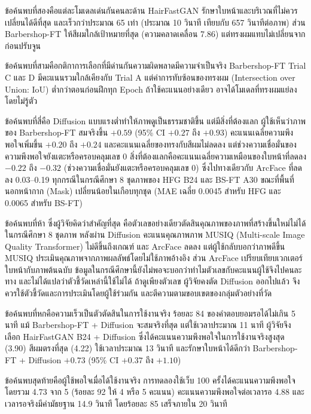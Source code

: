 ข้อค้นพบที่สองคือแต่ละโมเดลเด่นกันคนละด้าน
HairFastGAN รักษาใบหน้าและบริเวณที่ไม่ควรเปลี่ยนได้ดีที่สุด และเร็วกว่าประมาณ 65 เท่า
(ประมาณ 10 วินาที เทียบกับ 657 วินาทีต่อภาพ)
ส่วน Barbershop-FT ให้สีผมใกล้เป้าหมายที่สุด (ความคลาดเคลื่อน 7.86) แต่ทรงผมแทบไม่เปลี่ยนจากก่อนปรับจูน

ข้อค้นพบที่สามคือกติกาการเลือกที่มีด่านกันความผิดพลาดมีความจำเป็นจริง
Barbershop-FT Trial C และ D มีคะแนนรวมใกล้เคียงกับ Trial A
แต่ค่าการทับซ้อนของทรงผม (Intersection over Union: IoU) ต่ำกว่าตอนก่อนฝึกทุก Epoch
ถ้าใช้คะแนนอย่างเดียว อาจได้โมเดลที่ทรงผมแย่ลงโดยไม่รู้ตัว

ข้อค้นพบที่สี่คือ Diffusion แบบแรงต่ำทำให้ภาพดูเป็นธรรมชาติขึ้น แต่มีสิ่งที่ต้องแลก
ผู้ใช้เห็นว่าภาพของ Barbershop-FT สมจริงขึ้น $+0.59$ (95\% CI $+0.27$ ถึง $+0.93$)
คะแนนเฉลี่ยความพึงพอใจเพิ่มขึ้น $+0.20$ ถึง $+0.24$ และคะแนนเฉลี่ยของทรงกับสีผมไม่ลดลง
แต่ช่วงความเชื่อมั่นของความพึงพอใจยังแตะหรือครอบคลุมเลข 0
สิ่งที่ต้องแลกคือคะแนนเฉลี่ยความเหมือนของใบหน้าที่ลดลง $-0.22$ ถึง $-0.32$ (ช่วงความเชื่อมั่นยังแตะหรือครอบคลุมเลข 0)
ซึ่งไปทางเดียวกับ ArcFace ที่ลดลง 0.03--0.19 ทุกกรณีในกรณีศึกษา 8 ชุดภาพของ HFG B24 และ BS-FT A30
ขณะที่พื้นที่นอกหน้ากาก (Mask) เปลี่ยนน้อยในเกือบทุกชุด (MAE เฉลี่ย 0.0045 สำหรับ HFG และ 0.0065 สำหรับ BS-FT)

ข้อค้นพบที่ห้า ซึ่งผู้วิจัยคิดว่าสำคัญที่สุด คือตัวเลขอย่างเดียวตัดสินคุณภาพของภาพที่สร้างขึ้นใหม่ไม่ได้
ในกรณีศึกษา 8 ชุดภาพ หลังผ่าน Diffusion คะแนนคุณภาพภาพ MUSIQ (Multi-scale Image Quality Transformer) ไม่ดีขึ้นถึงเกณฑ์ และ ArcFace ลดลง
แต่ผู้ใช้กลับบอกว่าภาพดีขึ้น
MUSIQ ประเมินคุณภาพจากภาพผลลัพธ์โดยไม่ใช้ภาพอ้างอิง ส่วน ArcFace เปรียบเทียบเวกเตอร์ใบหน้ากับภาพต้นฉบับ
ข้อมูลในกรณีศึกษานี้ยังไม่พอจะบอกว่าทำไมตัวเลขกับคะแนนผู้ใช้จึงไปคนละทาง และไม่ได้แปลว่าตัวชี้วัดเหล่านี้ใช้ไม่ได้
ถ้าดูเพียงตัวเลข ผู้วิจัยคงตัด Diffusion ออกไปแล้ว
จึงควรใช้ตัวชี้วัดและการประเมินโดยผู้ใช้ร่วมกัน และตีความตามขอบเขตของกลุ่มตัวอย่างที่วัด

ข้อค้นพบที่หกคือความเร็วเป็นตัวตัดสินในการใช้งานจริง
ร้อยละ 84 ของคำตอบยอมรอได้ไม่เกิน 5 นาที แม้ Barbershop-FT + Diffusion จะสมจริงที่สุด
แต่ใช้เวลาประมาณ 11 นาที ผู้วิจัยจึงเลือก HairFastGAN B24 + Diffusion
ซึ่งได้คะแนนความพึงพอใจในการใช้งานจริงสูงสุด (3.90) สีผมตรงที่สุด (4.22) ใช้เวลาประมาณ 13 วินาที
และรักษาใบหน้าได้ดีกว่า Barbershop-FT + Diffusion $+0.73$ (95\% CI $+0.37$ ถึง $+1.10$)

ข้อค้นพบสุดท้ายคือผู้ใช้พอใจเมื่อได้ใช้งานจริง การทดลองใช้เว็บ 100 ครั้งได้คะแนนความพึงพอใจโดยรวม 4.73 จาก 5
(ร้อยละ 92 ให้ 4 หรือ 5 คะแนน) คะแนนความพึงพอใจต่อเวลารอ 4.88
และเวลารอจริงมีค่ามัธยฐาน 14.9 วินาที โดยร้อยละ 85 เสร็จภายใน 20 วินาที

